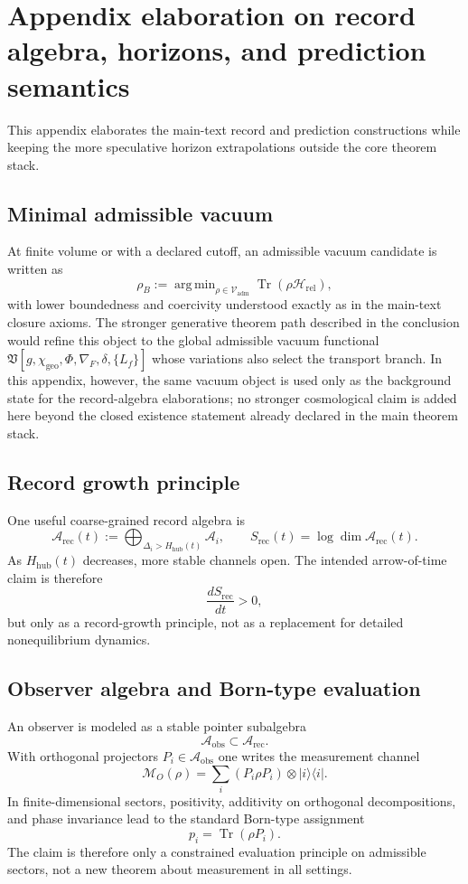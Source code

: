 \documentclass[11pt,a4paper]{article}
\theoremstyle{definition}
\theoremstyle{remark}
\DeclareMathOperator{\tr}{Tr}
\DeclareMathOperator{\argmin}{arg\,min}
\newcommand{\Arec}{\mathcal A_{\mathrm{rec}}}
\newcommand{\Aobs}{\mathcal A_{\mathrm{obs}}}
\newcommand{\Vadm}{\mathcal V_{\mathrm{adm}}}
\newcommand{\Hrel}{\mathcal H_{\mathrm{rel}}}
\newcommand{\Hhub}{H_{\mathrm{hub}}}
\newcommand{\chigeo}{\chi_{\mathrm{geo}}}
\begin{document}
\section{Appendix elaboration on record algebra, horizons, and prediction semantics}
\label{app:record}

This appendix elaborates the main-text record and prediction constructions while keeping the more speculative horizon extrapolations outside the core theorem stack.

\subsection{Minimal admissible vacuum}

At finite volume or with a declared cutoff, an admissible vacuum candidate is written as
\[
\rho_B
:=
\argmin_{\rho\in\Vadm}\tr(\rho\Hrel),
\]
with lower boundedness and coercivity understood exactly as in the main-text closure axioms. The stronger generative theorem path described in the conclusion would refine this object to the global admissible vacuum functional $\mathfrak V[g,\chigeo,\Phi,\nabla_F,\delta,\{L_f\}]$ whose variations also select the transport branch. In this appendix, however, the same vacuum object is used only as the background state for the record-algebra elaborations; no stronger cosmological claim is added here beyond the closed existence statement already declared in the main theorem stack.

\subsection{Record growth principle}

One useful coarse-grained record algebra is
\[
\Arec(t):=\bigoplus_{\Delta_i>\Hhub(t)}\mathcal A_i,
\qquad
S_{\mathrm{rec}}(t)=\log\dim\Arec(t).
\]
As $\Hhub(t)$ decreases, more stable channels open. The intended arrow-of-time claim is therefore
\[
\frac{dS_{\mathrm{rec}}}{dt}>0,
\]
but only as a record-growth principle, not as a replacement for detailed nonequilibrium dynamics.

\subsection{Observer algebra and Born-type evaluation}

An observer is modeled as a stable pointer subalgebra
\[
\Aobs\subset\Arec.
\]
With orthogonal projectors $P_i\in\Aobs$ one writes the measurement channel
\[
\mathcal M_O(\rho)=\sum_i(P_i\rho P_i)\otimes |i\rangle\langle i|.
\]
In finite-dimensional sectors, positivity, additivity on orthogonal decompositions, and phase invariance lead to the standard Born-type assignment
\[
p_i=\tr(\rho P_i).
\]
The claim is therefore only a constrained evaluation principle on admissible sectors, not a new theorem about measurement in all settings.
\end{document}
